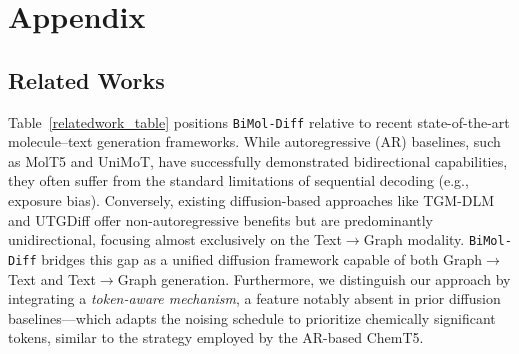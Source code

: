 
\section{Appendix}\label{sec:App}

\subsection{Related Works}\label{related work}
Table~\ref{relatedwork_table} positions \texttt{BiMol-Diff} relative to recent state-of-the-art molecule--text generation frameworks. While autoregressive (AR) baselines, such as MolT5 and UniMoT, have successfully demonstrated bidirectional capabilities, they often suffer from the standard limitations of sequential decoding (e.g., exposure bias). Conversely, existing diffusion-based approaches like TGM-DLM and UTGDiff offer non-autoregressive benefits but are predominantly unidirectional, focusing almost exclusively on the Text$\to$Graph modality. \texttt{BiMol-Diff} bridges this gap as a unified diffusion framework capable of both Graph$\to$Text and Text$\to$Graph generation. Furthermore, we distinguish our approach by integrating a \textit{token-aware mechanism}, a feature notably absent in prior diffusion baselines—which adapts the noising schedule to prioritize chemically significant tokens, similar to the strategy employed by the AR-based ChemT5.

